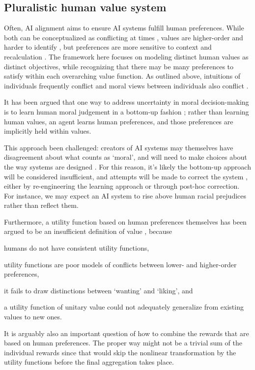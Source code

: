 


\subsection{Pluralistic human value system}

Often, AI alignment aims to ensure AI systems fulfill human preferences. While both can be conceptualized as conflicting at times \cite{sotala2016defining}, values are higher-order and harder to identify \cite{barrett2008learning}, but preferences are more sensitive to context and recalculation \cite{warren2011values}. The framework here focuses on modeling distinct human values as distinct objectives, while recognizing that there may be many preferences to satisfy within each overarching value function. As outlined above, intuitions of individuals frequently conflict \cite{haidt2001emotional} and moral views between individuals also conflict \cite{bogosian_implementation_2017}.

It has been argued that one way to address uncertainty in moral decision-making is to learn human moral judgement in a bottom-up fashion \cite{bogosian_implementation_2017}; rather than learning human values, an agent learns human preferences, and those preferences are implicitly held within values. 

This approach been challenged: creators of AI systems may themselves have disagreement about what counts as `moral', and will need to make choices about the way systems are designed  \cite{bogosian_implementation_2017}. For this reason, it's likely the bottom-up approach will be considered insufficient, and attempts will be made to correct the system \cite{stray2020you}, either by re-engineering the learning approach or through post-hoc correction. For instance, we may expect an AI system to rise above human racial prejudices rather than reflect them. 

Furthermore, a utility function based on human preferences themselves has been argued to be an insufficient definition of value \cite{sotala2016defining, DBLP:journals/corr/abs-1712-05812}, because \begin{enumerate*}
    \item humans do not have consistent utility functions,
    \item utility functions are poor models of conflicts between lower- and higher-order preferences,
    \item it fails to draw distinctions between `wanting' and `liking', and
    \item a utility function of unitary value could not adequately generalize from existing values to new ones.
\end{enumerate*}
It is arguably also an important question of how to combine the rewards that are based on human preferences. The proper way might not be a trivial sum of the individual rewards since that would skip the nonlinear transformation by the utility functions before the final aggregation takes place. 

